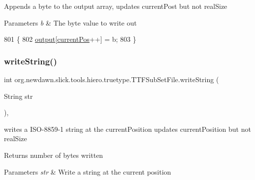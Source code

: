 Appends a byte to the output array, updates current\+Post but not real\+Size


\begin{DoxyParams}{Parameters}
{\em b} & The byte value to write out \\
\hline
\end{DoxyParams}

\begin{DoxyCode}
801                                    \{
802         \mbox{\hyperlink{classorg_1_1newdawn_1_1slick_1_1tools_1_1hiero_1_1truetype_1_1_t_t_f_sub_set_file_a967f26c7cbd2c428f7ca96c4958edded}{output}}[\mbox{\hyperlink{classorg_1_1newdawn_1_1slick_1_1tools_1_1hiero_1_1truetype_1_1_t_t_f_sub_set_file_a5027011db0d9c307afa8de09102eaa10}{currentPos}}++] = b;
803     \}
\end{DoxyCode}
\mbox{\label{classorg_1_1newdawn_1_1slick_1_1tools_1_1hiero_1_1truetype_1_1_t_t_f_sub_set_file_a2a311e7c3644497626ca47c7c2a0b034}} 
\subsubsection{\texorpdfstring{write\+String()}{writeString()}}
{\footnotesize\ttfamily int org.\+newdawn.\+slick.\+tools.\+hiero.\+truetype.\+T\+T\+F\+Sub\+Set\+File.\+write\+String (\begin{DoxyParamCaption}\item[{String}]{str }\end{DoxyParamCaption})\hspace{0.3cm}{\ttfamily [inline]}, {\ttfamily [private]}}

writes a I\+S\+O-\/8859-\/1 string at the current\+Position updates current\+Position but not real\+Size \begin{DoxyReturn}{Returns}
number of bytes written
\end{DoxyReturn}

\begin{DoxyParams}{Parameters}
{\em str} & Write a string at the current position \\
\hline
\end{DoxyParams}

